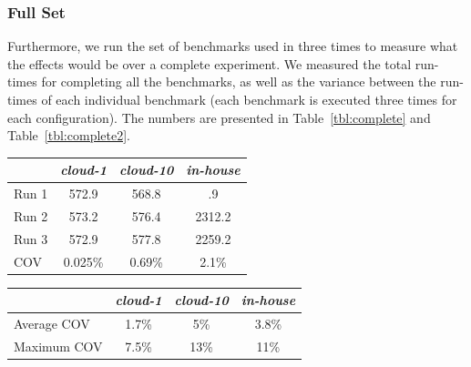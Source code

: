 \documentclass[a4paper]{IEEEtran}
\begin{document}
\subsubsection{Full Set}
Furthermore, we run the set of benchmarks used in \cite{uppsat} three
times to measure what the effects would be over a complete
experiment. We measured the total run-times for completing all the benchmarks, as well as the variance between the run-times of each individual benchmark (each benchmark is executed three times for each configuration). The numbers are presented in Table~\ref{tbl:complete} and Table~\ref{tbl:complete2}.
\vspace{1em}
\begin{Figure}
  \centering
\begin{tabular}{|l|c|c|c|}
  \hline
& \emph{cloud-1} & \emph{cloud-10} & \emph{in-house} \\
  \hline
  Run 1 &  572.9 & 568.8 & .9 \\
  \hline
  Run 2 & 573.2  & 576.4 &  2312.2 \\
  \hline
  Run 3 & 572.9 & 577.8 & 2259.2 \\
  \hline
  COV & 0.025\% & 0.69\%  & 2.1\% \\
  \hline        
\end{tabular}
\label{tbl:complete}
\end{Figure}

\begin{Figure}
  \centering
  \begin{tabular}{|l|c|c|c|}
    \hline
    & \emph{cloud-1} & \emph{cloud-10} & \emph{in-house} \\
  \hline
  Average COV & 1.7\% & 5\% & 3.8\% \\
  \hline
  Maximum COV  & 7.5\% & 13\% & 11\% \\
  \hline
\end{tabular}
  \label{tbl:complete2}
\end{Figure}

\vspace{2em}
\end{document}

